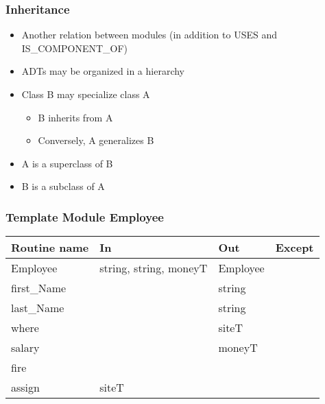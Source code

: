 \documentclass[t,12pt,numbers,fleqn,handout]{beamer}
\begin{document}

\begin{frame}
\frametitle{Inheritance}
\begin{itemize}
\item Another relation between modules (in addition to USES and IS\_COMPONENT\_OF)
\item ADTs may be organized in a hierarchy
\item Class B may specialize class A
\begin{itemize}
\item B inherits from A
\item Conversely, A generalizes B
\end{itemize}
\item A is a superclass of B
\item B is a subclass of A
\end{itemize}
\end{frame}


\begin{frame}
\frametitle{Template Module Employee}

\begin{tabular}{| l | l | l | l |}
\hline
\textbf{Routine name} & \textbf{In} & \textbf{Out} & \textbf{Except}\\
\hline
Employee & string, string, moneyT & Employee & ~\\
\hline
first\_Name & ~ & string & ~\\
\hline
last\_Name & ~ & string & ~\\
\hline
where & ~ & siteT & ~\\
\hline
salary & ~ & moneyT & ~\\
\hline
fire & ~ & ~ & ~\\
\hline
assign & siteT & ~ & ~\\
\hline
\end{tabular}\\

\end{frame}

\end{document}
